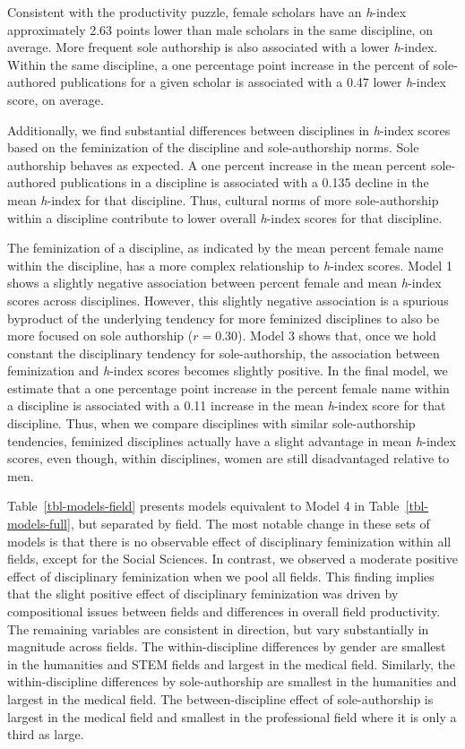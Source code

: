 \documentclass[
  10pt,
  letterpaper,
]{article}
\begin{document}
Consistent with the productivity puzzle, female scholars have an
\emph{h}-index approximately 2.63 points lower than male scholars in the
same discipline, on average. More frequent sole authorship is also
associated with a lower \emph{h}-index. Within the same discipline, a
one percentage point increase in the percent of sole-authored
publications for a given scholar is associated with a 0.47 lower
\emph{h}-index score, on average.

Additionally, we find substantial differences between disciplines in
\emph{h}-index scores based on the feminization of the discipline and
sole-authorship norms. Sole authorship behaves as expected. A one
percent increase in the mean percent sole-authored publications in a
discipline is associated with a 0.135 decline in the mean \emph{h}-index
for that discipline. Thus, cultural norms of more sole-authorship within
a discipline contribute to lower overall \emph{h}-index scores for that
discipline.

The feminization of a discipline, as indicated by the mean percent
female name within the discipline, has a more complex relationship to
\emph{h}-index scores. Model 1 shows a slightly negative association
between percent female and mean \emph{h}-index scores across
disciplines. However, this slightly negative association is a spurious
byproduct of the underlying tendency for more feminized disciplines to
also be more focused on sole authorship (\(r=0.30\)). Model 3 shows
that, once we hold constant the disciplinary tendency for
sole-authorship, the association between feminization and \emph{h}-index
scores becomes slightly positive. In the final model, we estimate that a
one percentage point increase in the percent female name within a
discipline is associated with a 0.11 increase in the mean \emph{h}-index
score for that discipline. Thus, when we compare disciplines with
similar sole-authorship tendencies, feminized disciplines actually have
a slight advantage in mean \emph{h}-index scores, even though, within
disciplines, women are still disadvantaged relative to men.

Table~\ref{tbl-models-field} presents models equivalent to Model 4 in
Table~\ref{tbl-models-full}, but separated by field. The most notable
change in these sets of models is that there is no observable effect of
disciplinary feminization within all fields, except for the Social
Sciences. In contrast, we observed a moderate positive effect of
disciplinary feminization when we pool all fields. This finding implies
that the slight positive effect of disciplinary feminization was driven
by compositional issues between fields and differences in overall field
productivity. The remaining variables are consistent in direction, but
vary substantially in magnitude across fields. The within-discipline
differences by gender are smallest in the humanities and STEM fields and
largest in the medical field. Similarly, the within-discipline
differences by sole-authorship are smallest in the humanities and
largest in the medical field. The between-discipline effect of
sole-authorship is largest in the medical field and smallest in the
professional field where it is only a third as large.
\end{document}
